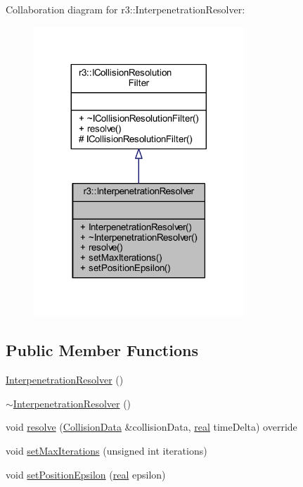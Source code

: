 Collaboration diagram for r3\+:\+:Interpenetration\+Resolver\+:\nopagebreak
\begin{figure}[H]
\begin{center}
\leavevmode
\includegraphics[width=224pt]{classr3_1_1_interpenetration_resolver__coll__graph}
\end{center}
\end{figure}
\subsection*{Public Member Functions}
\begin{DoxyCompactItemize}
\item 
\mbox{\hyperlink{classr3_1_1_interpenetration_resolver_a6a739e8121bba89238f0db2a573eb272}{Interpenetration\+Resolver}} ()
\item 
\mbox{\hyperlink{classr3_1_1_interpenetration_resolver_a2c0f47fd620356e06fb9e16387b7e83b}{$\sim$\+Interpenetration\+Resolver}} ()
\item 
void \mbox{\hyperlink{classr3_1_1_interpenetration_resolver_a7c896a7e8e0321c9f26b3d9c616d16ee}{resolve}} (\mbox{\hyperlink{classr3_1_1_collision_data}{Collision\+Data}} \&collision\+Data, \mbox{\hyperlink{namespacer3_ab2016b3e3f743fb735afce242f0dc1eb}{real}} time\+Delta) override
\item 
void \mbox{\hyperlink{classr3_1_1_interpenetration_resolver_a8250baac4ce0ed634002ed3be4515519}{set\+Max\+Iterations}} (unsigned int iterations)
\item 
void \mbox{\hyperlink{classr3_1_1_interpenetration_resolver_ad70802061f5f8868622cc5024a10f8cf}{set\+Position\+Epsilon}} (\mbox{\hyperlink{namespacer3_ab2016b3e3f743fb735afce242f0dc1eb}{real}} epsilon)
\end{DoxyCompactItemize}
